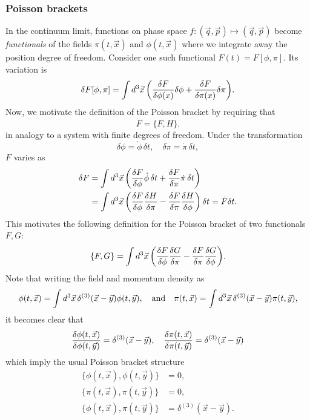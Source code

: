 \documentclass{article}
\begin{document}
\subsubsection{Poisson brackets}
In the continuum limit, functions on phase space $ f: (\vec{q},\vec{p}) \longmapsto (\vec{q},\vec{p}) $ become \textit{functionals} of the fields $ \pi(t, \vec{x}) $ and $ \phi(t, \vec{x}) $ where we integrate away the position degree of freedom. Consider one such functional $ F(t) = F[\phi, \pi] $. Its variation is
\begin{equation}
	\delta F[\phi, \pi] = \int \dd[3]{\vec{x}} \qty(\fdv{F}{\phi(x)} \delta \phi + \fdv{F}{\pi(x)} \delta \pi).
\end{equation}
Now, we motivate the definition of the Poisson bracket by requiring that
\begin{equation}
	\dot{F} = \{ F, H \}.
\end{equation}
in analogy to a system with finite degrees of freedom. Under the transformation
\begin{equation}
	\delta \phi = \dot{\phi}\, \delta t, \quad \delta \pi = \dot{\pi}\, \delta t,
\end{equation}
$ F $ varies as
\begin{align}
	\begin{split}
		\delta F &= \int \dd[3]{\vec{x}} \qty(\fdv{F}{\phi} \dot{\phi} \, \delta t + \fdv{F}{\pi} \dot{\pi} \, \delta t) \\
		&= \int \dd[3]{\vec{x}}  \qty(\fdv{F}{\phi} \fdv{H}{\pi} - \fdv{F}{\pi} \fdv{H}{\phi}) \, \delta t = \dot{F} \delta t.
	\end{split}
\end{align}
This motivates the following definition for the Poisson bracket of two functionals $ F, G $:
\begin{equation}
	\qty{ F, G } = \int \dd[3]{\vec{x}} \qty(\fdv{F}{\phi} \fdv{G}{\pi} - \fdv{F}{\pi} \fdv{G}{\phi}).
\end{equation}
Note that writing the field and momentum density as
\begin{equation}
	\phi(t, \vec{x}) = \int\dd[3]{\vec{x}} \delta^{(3)}(\vec{x} - \vec{y}) \phi(t, \vec{y}), \qq{and} \pi(t, \vec{x}) = \int\dd[3]{\vec{x}} \delta^{(3)}(\vec{x} - \vec{y}) \pi(t, \vec{y}),
\end{equation}
it becomes clear that
\begin{equation}
	\fdv{\phi(t,\vec{x})}{\phi(t,\vec{y})} = \delta^{(3)} (\vec{x} - \vec{y}), \quad \fdv{\pi(t,\vec{x})}{\pi(t,\vec{y})} = \delta^{(3)}(\vec{x} - \vec{y})
\end{equation}
which imply the usual Poisson bracket structure
\begin{align}
	\{ \phi(t, \vec{x}), \phi(t, \vec{y}) \} &= 0, \\
		\{ \pi(t, \vec{x}), \pi(t, \vec{y}) \} &= 0, \\
			\{ \phi(t, \vec{x}), \pi(t, \vec{y}) \} &= \delta^{(3)}(\vec{x} - \vec{y}).
\end{align}
\end{document}
